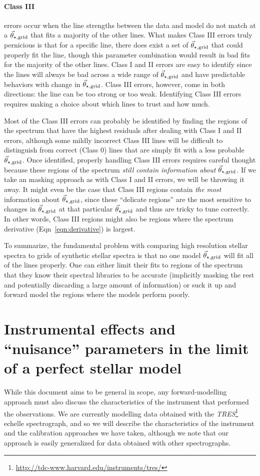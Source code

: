 \documentclass[preprint]{aastex} %
\newcommand{\vt}{\vec{\theta}}
\newcommand{\vg}{\vt_{\star, {\rm grid}}}
\begin{document}
\paragraph{Class III} errors occur when the line strengths between the data and model do not match at a $\vg$ that fits a majority of the other lines. What makes Class III errors truly pernicious is that for a specific line, there does exist a set of $\vg$ that could properly fit the line, though this parameter combination would result in bad fits for the majority of the other lines. Class I and II errors are easy to identify since the lines will always be bad across a wide range of $\vg$ and have predictable behaviors with change in $\vg$. Class III errors, however, come in both directions: the line can be too strong or too weak. Identifying Class III errors requires making a choice about which lines to trust and how much. 

Most of the Class III errors can probably be identified by finding the regions of the spectrum that have the highest residuals after dealing with Class I and II errors, although some mildly incorrect Class III lines will be difficult to distinguish from correct (Class 0) lines that are simply fit with a less probable $\vg$. Once identified, properly handling Class III errors requires careful thought because these regions of the spectrum \emph{still contain information about $\vg$}. If we take an masking approach as with Class I and II errors, we will be throwing it away. It might even be the case that Class III regions contain \emph{the most} information about $\vg$, since these ``delicate regions'' are the most sensitive to changes in $\vg$ at that particular $\vg$ and thus are tricky to tune correctly. In other words, Class III regions might also be regions where the spectrum derivative (Eqn~\ref{eqn:derivative}) is largest.

To summarize, the fundamental problem with comparing high resolution stellar spectra to grids of synthetic stellar spectra is that no one model $\vg$ will fit all of the lines properly. One can either limit their fits to regions of the spectrum that they know their spectral libraries to be accurate (implicitly masking the rest and potentially discarding a large amount of information) or suck it up and forward model the regions where the models perform poorly.


\section{Instrumental effects and ``nuisance'' parameters in the limit of a perfect stellar model}
\label{sec:perfect}
While this document aims to be general in scope, any forward-modelling approach must also discuss the characteristics of the instrument that performed the observations. We are currently modelling data obtained with the \emph{TRES}\footnote{\url{http://tdc-www.harvard.edu/instruments/tres/}} echelle spectrograph, and so we will describe the characteristics of the instrument and the calibration approaches we have taken, although we note that our approach is easily generalized for data obtained with other spectrographs.
\end{document}

